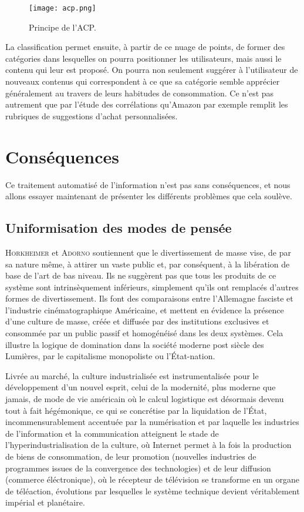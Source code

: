 \documentclass[a4paper,14pt]{extreport}
\begin{document}
\begin{figure}[ht]
 \begin{center}
  \texttt{[image: acp.png]}
 \end{center}
    \caption{Principe de l'ACP.}
 \label{acp}
\end{figure}

La classification permet ensuite, à partir de ce nuage de points, de former des catégories dans lesquelles on pourra positionner les utilisateurs, mais aussi le contenu qui leur est proposé. On pourra non seulement suggérer à l'utilisateur de nouveaux contenus qui correspondent à ce que sa catégorie semble apprécier généralement au travers de leurs habitudes de consommation. Ce n'est pas autrement que par l'étude des corrélations qu'Amazon par exemple remplit les rubriques de suggestions d'achat personnalisées.

\section{Conséquences}

Ce traitement automatisé de l'information n'est pas sans conséquences, et nous allons essayer maintenant de présenter les différents problèmes que cela soulève.

\subsection{Uniformisation des modes de pensée}

\textsc{Horkheimer} et \textsc{Adorno} soutiennent que le divertissement de masse vise, de par sa nature même, à attirer un vaste public et, par conséquent, à la libération de base de l'art de bas niveau. Ils ne suggèrent pas que tous les produits de ce système sont intrinsèquement inférieurs, simplement qu'ils ont remplacés d'autres formes de divertissement. Ils font des comparaisons entre l'Allemagne fasciste et l'industrie cinématographique Américaine, et mettent en évidence la présence d'une culture de masse, créée et diffusée par des institutions exclusives et consommée par un public passif et homogénéisé dans les deux systèmes. Cela illustre la logique de domination dans la société moderne post siècle des Lumières, par le capitalisme monopoliste ou l'État-nation.

Livrée au marché, la culture industrialisée est instrumentalisée pour le développement d'un nouvel esprit, celui de la modernité, plus moderne que jamais, de mode de vie américain où le calcul logistique est désormais devenu tout à fait hégémonique, ce qui se concrétise par la liquidation de l'État, incommensurablement accentuée par la numérisation et par laquelle les industries de l'information et la communication atteignent le stade de l'hyperindustrialisation de la culture, où Internet permet à la fois la production de biens de consommation, de leur promotion (nouvelles industries de programmes issues de la convergence des technologies) et de leur diffusion (commerce éléctronique), où le récepteur de télévision se transforme en un organe de téléaction, évolutions par lesquelles le système technique devient véritablement impérial et planétaire.
\end{document}
